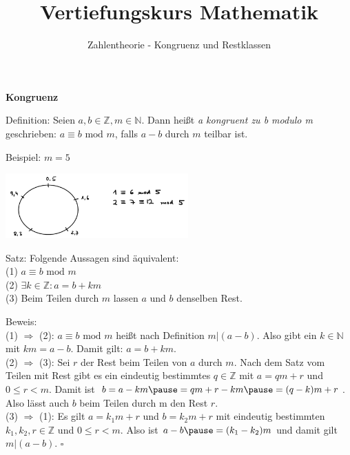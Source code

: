 \usepackage[ngerman]{babel}
\usepackage[utf8]{inputenc}
\usepackage{amsmath}
\usepackage{amssymb}
\usepackage{listings} 
\usepackage{stmaryrd}
\lstset{language=Python, tabsize=4, showstringspaces=false,basicstyle=\footnotesize,mathescape=true} 
\usepackage{mathtools}
\usepackage{ulem}
\usepackage{tikz}

\parskip 10pt
\newcommand{\ggT}{\operatorname{ggT}}
\newcommand{\Mod}[3]{#1\equiv#2\text{ mod }#3}
\newcommand{\tmod}{\text{ mod }}



\title{Vertiefungskurs Mathematik}   
\author{Zahlentheorie - Kongruenz und Restklassen} 
\date{}
\frame{\titlepage} 

\begin{frame}[fragile]

\textbf{Kongruenz}

Definition: Seien $a, b \in \mathbb{Z}, m \in \mathbb{N}$. Dann heißt \textit{a kongruent zu b modulo m} geschrieben: \quad 
\quad $\Mod{a}{b}{m}$, \quad 
 falls $a-b$ durch $m$ teilbar ist. \pause
 
 Beispiel: $m = 5$
 
 \includegraphics[width=7cm]{bild1.png}
\end{frame}

\begin{frame}[fragile]

Satz: Folgende Aussagen sind äquivalent: \\
(1)  $\Mod{a}{b}{m}$ \\
(2) $\exists k \in \mathbb{Z}: a = b+ km$ \\
(3) Beim Teilen durch $m$ lassen $a$ und $b$ denselben Rest. \pause

Beweis: \\
(1) $\Rightarrow$ (2): $\Mod{a}{b}{m}$ heißt nach Definition $m|(a-b)$. \pause
Also gibt ein $k \in \mathbb{N}$ mit $k m = a - b.$ \pause Damit gilt: $a = b+ k  m$. \\ \pause
(2) $\Rightarrow$ (3): Sei $r$ der Rest beim Teilen von $a$ durch $m$. \pause Nach dem Satz vom Teilen mit Rest gibt es ein eindeutig bestimmtes $q \in \mathbb{Z}$ mit $a = q  m + r$ und $0 \le r < m$. \pause Damit ist  $b = a - km \pause = q m + r - km\pause =  (q - k)  m + r$. \pause Also lässt auch $b$ beim Teilen durch m den Rest $r$. \\ \pause 
(3) $\Rightarrow$ (1): \pause Es gilt $a = k_1  m + r$ und $b = k_2  m + r$ mit eindeutig bestimmten
$k_1, k_2,r  \in \mathbb{Z}$ und $0 \le r < m$. \pause Also ist $a-b \pause = (k_1-k_2)  m$ \pause und damit gilt $m|(a-b)$. \hfill $\square{}$

\end{frame}

